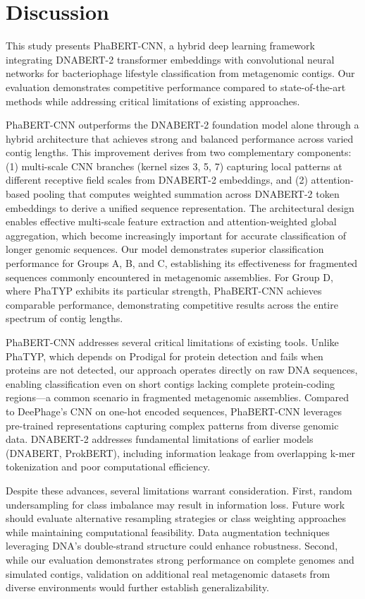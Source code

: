 \documentclass[runningheads]{llncs}
\begin{document}
\section{Discussion}\label{discussion}
This study presents PhaBERT-CNN, a hybrid deep learning framework integrating DNABERT-2 transformer embeddings with convolutional neural networks for bacteriophage lifestyle classification from metagenomic contigs. Our evaluation demonstrates competitive performance compared to state-of-the-art methods while addressing critical limitations of existing approaches.

PhaBERT-CNN outperforms the DNABERT-2\cite{zhou2023dnabert} foundation model alone through a hybrid architecture that achieves strong and balanced performance across varied contig lengths. This improvement derives from two complementary components: (1) multi-scale CNN branches (kernel sizes 3, 5, 7) capturing local patterns at different receptive field scales from DNABERT-2 embeddings, and (2) attention-based pooling that computes weighted summation across DNABERT-2 token embeddings to derive a unified sequence representation. The architectural design enables effective multi-scale feature extraction and attention-weighted global aggregation, which become increasingly important for accurate classification of longer genomic sequences. Our model demonstrates superior classification performance for Groups A, B, and C, establishing its effectiveness for fragmented sequences commonly encountered in metagenomic assemblies. For Group D, where PhaTYP exhibits its particular strength, PhaBERT-CNN achieves comparable performance, demonstrating competitive results across the entire spectrum of contig lengths.

PhaBERT-CNN addresses several critical limitations of existing tools. Unlike PhaTYP, which depends on Prodigal\cite{hyatt2010prodigal} for protein detection and fails when proteins are not detected, our approach operates directly on raw DNA sequences, enabling classification even on short contigs lacking complete protein-coding regions—a common scenario in fragmented metagenomic assemblies. Compared to DeePhage's CNN on one-hot encoded sequences, PhaBERT-CNN leverages pre-trained representations capturing complex patterns from diverse genomic data. DNABERT-2 addresses fundamental limitations of earlier models (DNABERT, ProkBERT), including information leakage from overlapping k-mer tokenization and poor computational efficiency.

Despite these advances, several limitations warrant consideration. First, random undersampling for class imbalance may result in information loss. Future work should evaluate alternative resampling strategies or class weighting approaches while maintaining computational feasibility. Data augmentation techniques leveraging DNA's double-strand structure could enhance robustness. Second, while our evaluation demonstrates strong performance on complete genomes and simulated contigs, validation on additional real metagenomic datasets from diverse environments would further establish generalizability.
\end{document}
